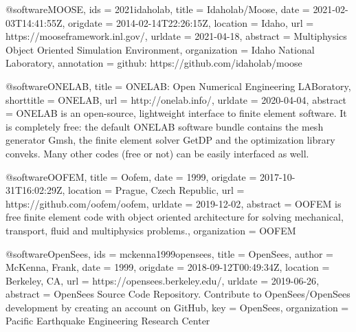 @software{MOOSE,
  ids = {2021idaholab},
  title = {Idaholab/Moose},
  date = {2021-02-03T14:41:55Z},
  origdate = {2014-02-14T22:26:15Z},
  location = {Idaho},
  url = {https://mooseframework.inl.gov/},
  urldate = {2021-04-18},
  abstract = {Multiphysics Object Oriented Simulation Environment},
  organization = {Idaho National Laboratory},
  annotation = {github: https://github.com/idaholab/moose}
}

@software{ONELAB,
  title = {{{ONELAB}}: {{Open Numerical Engineering LABoratory}}},
  shorttitle = {{{ONELAB}}},
  url = {http://onelab.info/},
  urldate = {2020-04-04},
  abstract = {ONELAB is an open-source, lightweight interface to finite element software. It is completely free: the default ONELAB software bundle contains the mesh generator Gmsh, the finite element solver GetDP and the optimization library conveks. Many other codes (free or not) can be easily interfaced as well.}
}

@software{OOFEM,
  title = {Oofem},
  date = {1999},
  origdate = {2017-10-31T16:02:29Z},
  location = {Prague, Czech Republic},
  url = {https://github.com/oofem/oofem},
  urldate = {2019-12-02},
  abstract = {OOFEM is free finite element code with object oriented architecture for solving mechanical, transport, fluid and multiphysics problems.},
  organization = {OOFEM}
}

@software{OpenSees,
  ids = {mckenna1999opensees},
  title = {{{OpenSees}}},
  author = {McKenna, Frank},
  date = {1999},
  origdate = {2018-09-12T00:49:34Z},
  location = {Berkeley, CA},
  url = {https://opensees.berkeley.edu/},
  urldate = {2019-06-26},
  abstract = {OpenSees Source Code Repository. Contribute to OpenSees/OpenSees development by creating an account on GitHub},
  key = {OpenSees},
  organization = {Pacific Earthquake Engineering Research Center}
}

